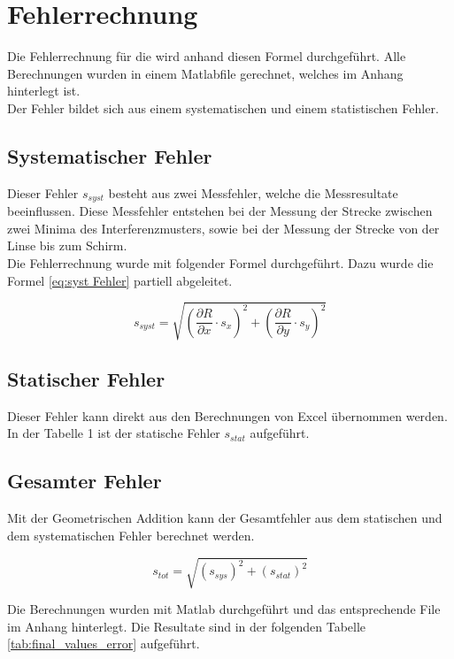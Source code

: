 \section{Fehlerrechnung}

Die Fehlerrechnung für die wird anhand diesen Formel durchgeführt. Alle Berechnungen wurden in einem Matlabfile gerechnet, welches im Anhang hinterlegt ist.\\
Der Fehler bildet sich aus einem systematischen und einem statistischen Fehler.
 
\subsection{Systematischer Fehler}
Dieser Fehler $ s_{syst} $ besteht aus zwei Messfehler, welche die Messresultate beeinflussen. Diese Messfehler entstehen bei der Messung der Strecke zwischen zwei Minima des Interferenzmusters, sowie bei der Messung der Strecke von der Linse bis zum Schirm. \\
Die Fehlerrechnung wurde mit folgender Formel durchgeführt. Dazu wurde die Formel \ref{eq:syst Fehler} partiell abgeleitet.

\begin{equation}
s_{syst} = \sqrt{\left(\frac{\partial R}{\partial x}\cdot s_{x}\right)^2+\left(\frac{\partial R}{\partial y}\cdot s_{y}\right)^2}
\label{eq:syst Fehler}
\end{equation}

\subsection{Statischer Fehler}
Dieser Fehler kann direkt aus den Berechnungen von Excel übernommen werden. In der Tabelle 1 ist der statische Fehler $ s_{stat} $ aufgeführt.

\subsection{Gesamter Fehler}
Mit der Geometrischen Addition kann der Gesamtfehler aus dem statischen und dem systematischen Fehler berechnet werden.

\begin{equation}
s_{tot} = \sqrt{(s_{sys})^2+(s_{stat})^2}
\label{eq:gesamter Fehler}
\end{equation}

Die Berechnungen wurden mit Matlab durchgeführt und das entsprechende File im Anhang hinterlegt. Die Resultate sind in der folgenden Tabelle \ref{tab:final_values_error} aufgeführt.

